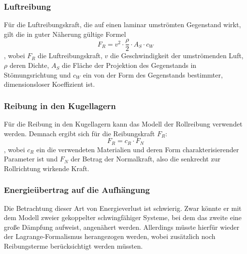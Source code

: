 \subsubsection{Luftreibung}
Für die Luftreibungskraft, die auf einen laminar umströmten Gegenstand wirkt, gilt die in guter Näherung gültige Formel
\begin{equation}
F_R = v^2 \cdot \frac{\rho}{2} \cdot A_S \cdot c_W
\end{equation}, 
wobei $ F_R $ die Luftreibungskraft, $ v $ die Geschwindigkeit der umströmenden Luft, $ \rho $ deren Dichte, $ A_S $ die Fläche der Projektion des Gegenstands in Stömungsrichtung und $ c_W $ ein von der Form des Gegenstands bestimmter, dimensionsloser Koeffizient ist. 


\subsubsection{Reibung in den Kugellagern}
Für die Reibung in den Kugellagern kann das Modell der Rollreibung verwendet werden. Demnach ergibt sich für die Reibungskraft $ F_R $:
\begin{equation}
F_R = c_R \cdot F_N
\end{equation}, 
wobei $ c_R $ ein die verwendeten Materialien und deren Form charakterisierender Parameter ist und $ F_N $ der Betrag der Normalkraft, also die senkrecht zur Rollrichtung wirkende Kraft. 

\subsubsection{Energieübertrag auf die Aufhängung}

Die Betrachtung dieser Art von Energieverlust ist schwierig. Zwar könnte er mit dem Modell zweier gekoppelter schwingfähiger Systeme, bei dem das zweite eine große Dämpfung aufweist, angenähert werden. Allerdings müsste hierfür wieder der Lagrange-Formalismus herangezogen werden, wobei zusätzlich noch Reibungsterme berücksichtigt werden müssten. 
